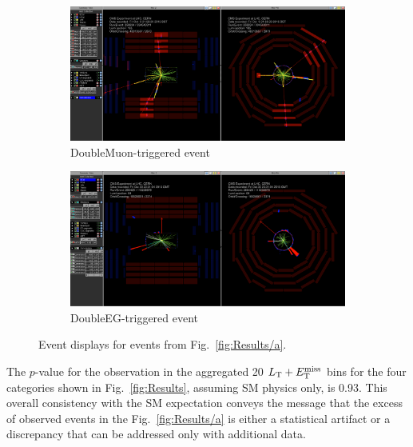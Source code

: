 \begin{figure}
\begin{center}
	\begin{subfigure}{\textwidth}
		\includegraphics[width=\textwidth]{Results/EventDisplay_DoubleMuon}
		\caption{DoubleMuon-triggered event \vspace{1em}}
	\end{subfigure}
	\begin{subfigure}{\textwidth}
		\includegraphics[width=\textwidth]{Results/EventDisplay_DoubleEG}
		\caption{DoubleEG-triggered event}
	\end{subfigure}
	\caption{Event displays for events from Fig.~\ref{fig:Results/a}.
	\label{fig:Results/eventDisplays}}
\end{center}
\end{figure}

The $p$-value for the observation in the aggregated 20 $L_\textrm{T} + E_{\mathrm{T}}^{\text{miss}}$ bins for the four categories shown in Fig.~\ref{fig:Results}, assuming SM physics only, is 0.93. This overall consistency with the SM expectation conveys the message that the excess of observed events in the Fig.~\ref{fig:Results/a} is either a statistical artifact or a discrepancy that can be addressed only with additional data.

